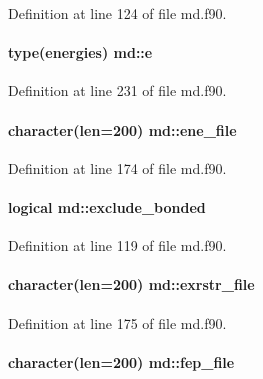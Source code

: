 Definition at line 124 of file md.\-f90.

\hypertarget{classmd_a24e4a11c732fef3d58a2b1c0db037ad2}{
\paragraph[{e}]{\setlength{\rightskip}{0pt plus 5cm}type(energies) md\-::e}}\label{classmd_a24e4a11c732fef3d58a2b1c0db037ad2}


Definition at line 231 of file md.\-f90.

\hypertarget{classmd_a2b6af58a2f39e4655f1e398305b4d019}{
\paragraph[{ene\-\_\-file}]{\setlength{\rightskip}{0pt plus 5cm}character(len=200) md\-::ene\-\_\-file}}\label{classmd_a2b6af58a2f39e4655f1e398305b4d019}


Definition at line 174 of file md.\-f90.

\hypertarget{classmd_ab338c93b4ea945b578d0e170a83584a9}{
\paragraph[{exclude\-\_\-bonded}]{\setlength{\rightskip}{0pt plus 5cm}logical md\-::exclude\-\_\-bonded}}\label{classmd_ab338c93b4ea945b578d0e170a83584a9}


Definition at line 119 of file md.\-f90.

\hypertarget{classmd_a63722655be0e7c6b3c774c406de66e4d}{
\paragraph[{exrstr\-\_\-file}]{\setlength{\rightskip}{0pt plus 5cm}character(len=200) md\-::exrstr\-\_\-file}}\label{classmd_a63722655be0e7c6b3c774c406de66e4d}


Definition at line 175 of file md.\-f90.

\hypertarget{classmd_a208872905042cd05432ab4e3032fc62d}{
\paragraph[{fep\-\_\-file}]{\setlength{\rightskip}{0pt plus 5cm}character(len=200) md\-::fep\-\_\-file}}\label{classmd_a208872905042cd05432ab4e3032fc62d}


